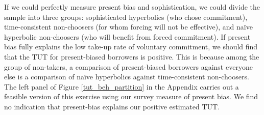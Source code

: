 \documentclass[12pt, a4paper]{article}
\begin{document}
If we could perfectly measure present bias and sophistication, we could divide the sample into three groups: sophisticated hyperbolics (who chose commitment), time-consistent non-choosers (for whom forcing will not be effective), and na\"{i}ve hyperbolic non-choosers (who will benefit from forced commitment). %
If present bias fully explains the low take-up rate of voluntary commitment, we should find that the TUT for present-biased borrowers is positive. This is because among the group of non-takers, a comparison of present-biased borrowers against everyone else is a comparison of na\"{i}ve hyperbolics against time-consistent non-choosers. The left panel of Figure \ref{tut_beh_partition} in the Appendix carries out a feasible version of this exercise using our survey measure of present bias.
We find no indication that present-bias explains our positive estimated TUT. 



\end{document}
